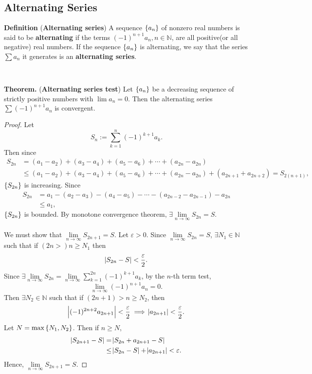 \documentclass[12pt,a4paper]{article}
\begin{document}
\subsection{Alternating Series}
\begin{tcolorbox}[colback=white]
	\textbf{Definition} (\textbf{Alternating series}) A sequence $\set{a_n}$ of nonzero real numbers is said to be \textbf{alternating} if the terms $(-1)^{n+1}a_n, n\in\mathbb{N}$, are all positive(or all negative) real numbers. If the sequence $\set{a_n}$ is alternating, we say that the series $\sum a_n$ it generates is an \textbf{alternating series}.
\end{tcolorbox}
\
\begin{tcolorbox}[colback=white]
	\textbf{Theorem.} (\textbf{Alternating series test}) Let $\set{a_n}$ be a decreasing sequence of strictly positive numbers with $\lim a_n=0$. Then the alternating series $\sum(-1)^{n+1}a_n$ is convergent.\tcblower\begin{proof}
		Let \[
		S_n:=\sum_{k=1}^n(-1)^{k+1}a_k.
		\] Then since \begin{align*}
		S_{2n} &=(a_1-a_2)+(a_3-a_4)+(a_5-a_6)+\cdots+(a_{2n}-a_{2n}) \\
		&\leq(a_1-a_2)+(a_3-a_4)+(a_5-a_6)+\cdots+(a_{2n}-a_{2n})+(a_{2n+1}+a_{2n+2})=S_{2(n+1)},
		\end{align*} $\set{S_{2n}}$ is increasing. Since \begin{align*}
		S_{2n} &=a_1-(a_2-a_3)-(a_4-a_5)-\cdots-(a_{2n-2}-a_{2n-1})-a_{2n} \\
		&\leq a_1,
		\end{align*} $\set{S_{2n}}$ is bounded. By monotone convergence theorem, $\exists\lim\limits_{n\to\infty}S_{2n}=S$.\\
		\\
		We must show that $\lim\limits_{n\to\infty}S_{2n+1}=S$. Let $\varepsilon>0$. Since $\lim\limits_{n\to\infty}S_{2n}=S$, $\exists N_1\in\mathbb{N}$ such that if $(2n>)n\geq N_1$ then \[
		\abs{S_{2n}-S}<\frac{\varepsilon}{2}.
		\] Since $\exists\lim\limits_{n\to\infty}S_{2n}=\lim\limits_{n\to\infty}\sum_{k=1}^{2n}(-1)^{k+1}a_k$, by the $n$-th term test, \[
		\lim\limits_{n\to\infty}(-1)^{n+1}a_n=0.
		\] Then $\exists N_2\in\mathbb{N}$ such that if $(2n+1)>n\geq N_2$, then \[
		\abs{(-1)^{2n+2}a_{2n+1}}<\frac{\varepsilon}{2}\implies \abs{a_{2n+1}}<\frac{\varepsilon}{2}.
		\] Let $N=\max\set{N_1,N_2}$. Then if $n\geq N$, \begin{align*}
		\abs{S_{2n+1}-S}&=\abs{S_{2n}+a_{2n+1}-S} \\
		&\leq \abs{S_{2n}-S}+\abs{a_{2n+1}} <\varepsilon.
		\end{align*} Hence, $\lim\limits_{n\to\infty}S_{2n+1}=S$.
	\end{proof}
\end{tcolorbox}
\end{document}
